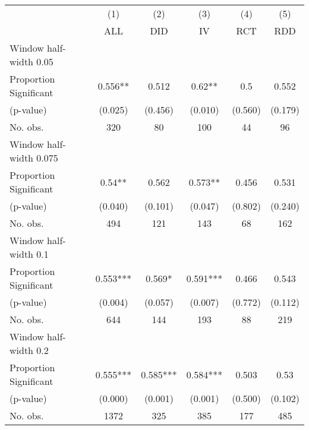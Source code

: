 
\def\sym#1{\ifmmode^{#1}\else\(^{#1}\)\fi}
\begin{tabular}{l*{5}{c}}
\hline\hline
& \multicolumn{1}{c}{(1)} &  \multicolumn{1}{c}{(2)} &  \multicolumn{1}{c}{(3)} &  \multicolumn{1}{c}{(4)} &  \multicolumn{1}{c}{(5)}\\
& \multicolumn{1}{c}{ALL} &  \multicolumn{1}{c}{DID} &  \multicolumn{1}{c}{IV} &  \multicolumn{1}{c}{RCT} &  \multicolumn{1}{c}{RDD}\\

\hline
\hline
Window half-width 0.05\\

Proportion Significant& 0.556** &  0.512 &  0.62** &  0.5 &  0.552\\

(p-value) & (0.025) &  (0.456) &  (0.010) &  (0.560) &  (0.179)\\

No. obs.& 320 &  80 &  100 &  44 &  96\\

\hline
Window half-width 0.075\\

Proportion Significant& 0.54** &  0.562 &  0.573** &  0.456 &  0.531\\

(p-value) & (0.040) &  (0.101) &  (0.047) &  (0.802) &  (0.240)\\

No. obs.& 494 &  121 &  143 &  68 &  162\\

\hline
Window half-width 0.1\\

Proportion Significant& 0.553*** &  0.569* &  0.591*** &  0.466 &  0.543\\

(p-value) & (0.004) &  (0.057) &  (0.007) &  (0.772) &  (0.112)\\

No. obs.& 644 &  144 &  193 &  88 &  219\\

\hline
Window half-width 0.2\\

Proportion Significant& 0.555*** &  0.585*** &  0.584*** &  0.503 &  0.53\\

(p-value) & (0.000) &  (0.001) &  (0.001) &  (0.500) &  (0.102)\\

No. obs.& 1372 &  325 &  385 &  177 &  485\\


\end{tabular}

